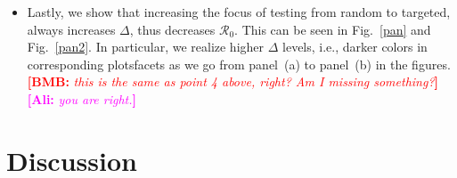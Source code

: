 \documentclass[12pt]{article}
\newcommand{\fref}[1]{Fig.~\ref{#1}}
\newcommand{\Rnum}{\ensuremath{\mathcal{R}_0}\xspace}
\DeclareRobustCommand\_{\ifmmode\expandafter\subtxt\else\textunderscore\fi}
\newcommand{\comment}{\showcomment}
\newcommand{\showcomment}[3]{\textcolor{#1}{\textbf{[#2: }\textsl{#3}\textbf{]}}}
\newcommand{\ali}[1]{\comment{magenta}{Ali}{#1}}
\newcommand{\bmb}[1]{\comment{red}{BMB}{#1}}
\theoremstyle{definition} %
\begin{document}
\begin{itemize}
  \bmb{I am still trying to understand why slowing testing return (decreasing $\omega$) decreases \Rnum over \textbf{most} of the parameter space considered here, which is a counterintuitive/silly result. Fast test returns help when we have high test positivity and low isolation during the waiting period (specifically, [much] lower isolation while waiting than when confirmed, but I think we're assuming that); we want to get waiting people into the ``confirmed'' compartment as quickly as possible. Can we understand/explain this result more thoroughly using that logic, and can we argue that what we are looking at is \emph{not} a realistic parameter range? Does the low baseline \Rnum we are using play into this, e.g. by reducing test positivity? Is there a simple expression for test positivity during the invasion phase?}

\item Lastly, we show that increasing the focus of testing from random to targeted, always increases $\Delta$, thus decreases \Rnum. This can be seen in \fref{pan} and \fref{pan2}. In particular, we realize higher $\Delta$ levels, i.e., darker colors in corresponding plots\/facets as we go from panel~(a) to panel~(b) in the figures. \bmb{this is the same as point 4 above, right? Am I missing something?}
\ali{you are right.}
\end{itemize}
  

\section{Discussion}
\end{document}
